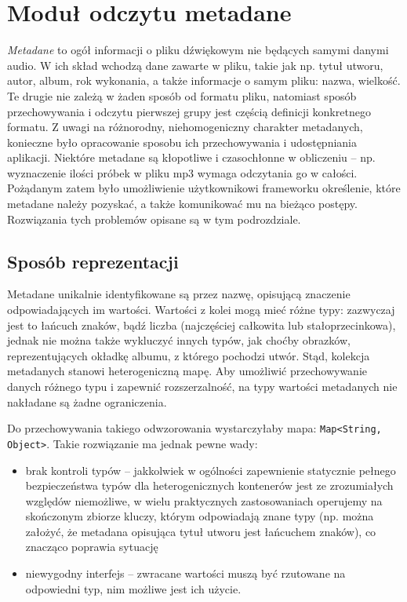
\section{Moduł odczytu metadane}

\emph{Metadane} to ogół informacji o pliku dźwiękowym nie będących samymi danymi audio. W ich skład
wchodzą dane zawarte w pliku, takie jak np. tytuł utworu, autor, album, rok wykonania, a także
informacje o samym pliku: nazwa, wielkość. Te drugie nie zależą w żaden sposób od formatu pliku,
natomiast sposób przechowywania i odczytu pierwszej grupy jest częścią definicji konkretnego
formatu. Z uwagi na różnorodny, niehomogeniczny charakter metadanych, konieczne było opracowanie
sposobu ich przechowywania i udostępniania aplikacji. Niektóre metadane są kłopotliwe i czasochłonne
w obliczeniu -- np. wyznaczenie ilości próbek w pliku mp3 wymaga odczytania go w całości. Pożądanym
zatem było umożliwienie użytkownikowi frameworku określenie, które metadane należy pozyskać, a także
komunikować mu na bieżąco postępy. Rozwiązania tych problemów opisane są w tym podrozdziale.

\subsection{Sposób reprezentacji}

Metadane unikalnie identyfikowane są przez nazwę, opisującą znaczenie odpowiadających im wartości.
Wartości z kolei mogą mieć różne typy: zazwyczaj jest to łańcuch znaków, bądź liczba (najczęściej
całkowita lub stałoprzecinkowa), jednak nie można także wykluczyć innych typów, jak choćby obrazków,
reprezentujących okładkę albumu, z którego pochodzi utwór. Stąd, kolekcja metadanych stanowi
heterogeniczną mapę. Aby umożliwić przechowywanie danych różnego typu i zapewnić rozszerzalność, na
typy wartości metadanych nie nakładane są żadne ograniczenia.

Do przechowywania takiego odwzorowania wystarczyłaby mapa: \texttt{Map<String, Object>}. Takie
rozwiązanie ma jednak pewne wady:

\begin{itemize}

  \item brak kontroli typów -- jakkolwiek w ogólności zapewnienie statycznie pełnego bezpieczeństwa
typów dla heterogenicznych kontenerów jest ze zrozumiałych względów niemożliwe, w wielu praktycznych
zastosowaniach operujemy na skończonym zbiorze kluczy, którym odpowiadają znane typy (np. można
założyć, że metadana opisująca tytuł utworu jest łańcuchem znaków), co znacząco poprawia sytuację

  \item niewygodny interfejs -- zwracane wartości muszą być rzutowane na odpowiedni typ, nim możliwe
jest ich użycie.

\end{itemize}

